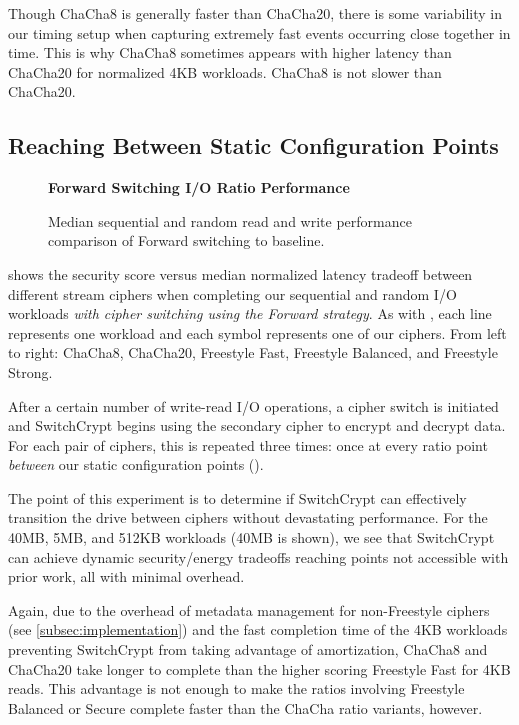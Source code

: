 Though ChaCha8 is generally faster than ChaCha20, there is some variability in
our timing setup when capturing extremely fast events occurring close together
in time. This is why ChaCha8 sometimes appears with higher latency than ChaCha20
for normalized 4KB workloads. ChaCha8 is not slower than ChaCha20.

\subsection{Reaching Between Static Configuration Points} \label{subsec:2}

\begin{figure}[ht]
  \textbf{Forward Switching I/O Ratio Performance}\par\medskip
  {} \caption{Median sequential and random
  read and write performance comparison of Forward switching to baseline.}
 \label{fig:tradeoff-with-ratios}
\end{figure}

 shows the security score versus median normalized
latency tradeoff between different stream ciphers when completing our sequential
and random I/O workloads \emph{with cipher switching using the Forward
strategy}. As with , each line represents one
workload and each symbol represents one of our ciphers. From left to right:
ChaCha8, ChaCha20, Freestyle Fast, Freestyle Balanced, and Freestyle Strong.

After a certain number of write-read I/O operations, a cipher switch is
initiated and SwitchCrypt begins using the secondary cipher to encrypt and
decrypt data. For each pair of ciphers, this is repeated three times: once at
every ratio point \emph{between} our static configuration points ().

The point of this experiment is to determine if SwitchCrypt can effectively
transition the drive between ciphers without devastating performance. For the
40MB, 5MB, and 512KB workloads (40MB is shown), we see that SwitchCrypt can
achieve dynamic security/energy tradeoffs reaching points not accessible with
prior work, all with minimal overhead.

Again, due to the overhead of metadata management for non-Freestyle ciphers (see
\cref{subsec:implementation}) and the fast completion time of the 4KB workloads
preventing SwitchCrypt from taking advantage of amortization, ChaCha8 and
ChaCha20 take longer to complete than the higher scoring Freestyle Fast for 4KB
reads. This advantage is not enough to make the ratios involving Freestyle
Balanced or Secure complete faster than the ChaCha ratio variants, however.


